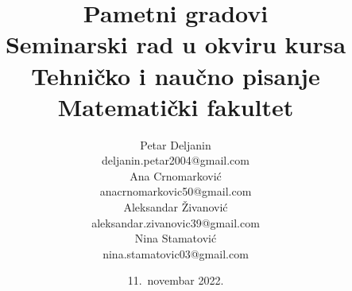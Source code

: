 \documentclass[a4paper,12pt]{article}
\begin{document}
\title{Pametni gradovi\\ \small{Seminarski rad u okviru kursa\\Tehničko i naučno pisanje\\ Matematički fakultet}}

\author{Petar Deljanin\\ deljanin.petar2004@gmail.com\\Ana Crnomarković\\ anacrnomarkovic50@gmail.com\\ Aleksandar Živanović\\ aleksandar.zivanovic39@gmail.com\\ Nina Stamatović\\ nina.stamatovic03@gmail.com}
\date{11.~novembar 2022.}
\maketitle
\end{document}

